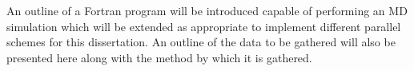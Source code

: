 An outline of a Fortran program will be introduced capable
of performing an MD simulation which will be extended as appropriate
to implement different parallel schemes for this dissertation.
%
An outline of the data to be gathered will also be presented here
along with the method by which it is gathered.
